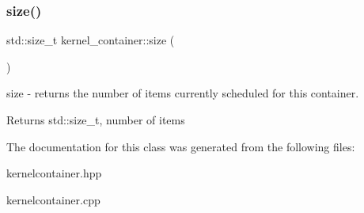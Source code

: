 \subsubsection{\texorpdfstring{size()}{size()}}
{\footnotesize\ttfamily std\+::size\+\_\+t kernel\+\_\+container\+::size (\begin{DoxyParamCaption}{ }\end{DoxyParamCaption})}

size -\/ returns the number of items currently scheduled for this container. \begin{DoxyReturn}{Returns}
std\+::size\+\_\+t, number of items 
\end{DoxyReturn}


The documentation for this class was generated from the following files\+:\begin{DoxyCompactItemize}
\item 
kernelcontainer.\+hpp\item 
kernelcontainer.\+cpp\end{DoxyCompactItemize}
